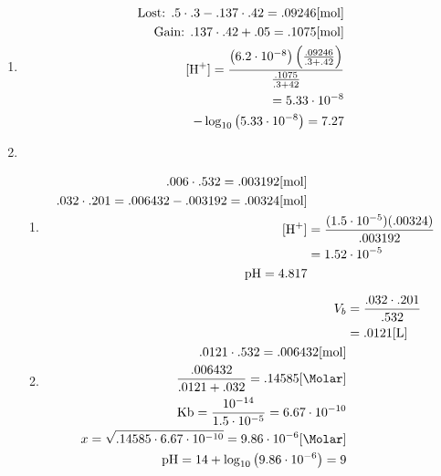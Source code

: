 \documentclass[12pt]{article}
\begin{document}
\begin{enumerate}
  \item {}

    \begin{equation}
      \begin{split}
        \text{Lost: } .5\cdot.3-.137\cdot.42=.09246[\si{\mole}]\\
        \text{Gain: } .137\cdot.42+.05=.1075[\si{\mole}]\\
        [\ce{H+}]=\frac{\left(6.2\cdot10^{-8}\right)\left( \frac{.09246}{.3+.42} \right)}{\frac{.1075}{.3+42}}\\
          =5.33\cdot10^{-8}\\
          -\log_{10}\left( 5.33\cdot10^{-8} \right)=7.27
      \end{split}
      \label{8}
    \end{equation}

  \item

    \begin{enumerate}

      \item 

    \begin{equation}
      \begin{split}
        .006\cdot.532=.003192[\si{\mole}]\\
        .032\cdot.201=.006432-.003192=.00324[\si{\mole}]\\
        [\ce{H+}]&=\frac{(1.5\cdot10^{-5})(.00324)}{.003192}\\
        &= 1.52\cdot10^{-5}\\
        \ce{pH}=4.817
      \end{split}
      \label{9}
    \end{equation}

      \item 

    \begin{equation}
      \begin{split}
        V_b&= \frac{.032\cdot.201}{.532}\\
        &= .0121[\si{\liter}]\\
        .0121\cdot.532=.006432[\si{\mole}]\\
        \frac{.006432}{.0121+.032}=.14585[\si{\Molar}]\\
        \ce{Kb}=\frac{10^{-14}}{1.5\cdot10^{-5}}=6.67\cdot10^{-10}\\
        x=\sqrt{.14585\cdot6.67\cdot10^{-10}}=9.86\cdot10^{-6}[\si{\Molar}]\\
        \ce{pH}=14+\log_{10}\left( 9.86\cdot10^{-6} \right)=9
      \end{split}
      \label{10}
    \end{equation}


\end{enumerate}
\end{enumerate}
\end{document}
